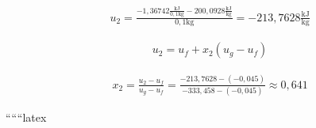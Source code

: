 \begin{align*}
    &u_2 = \frac{-1,36742 \frac{\text{kJ}}{0,1 \text{kg}} - 200,0928 \frac{\text{kJ}}{\text{kg}}}{0,1 \text{kg}} = -213,7628 \frac{\text{kJ}}{\text{kg}}
\end{align*}

\begin{align*}
    &u_2 = u_f + x_2 (u_g - u_f)
\end{align*}

\begin{align*}
    &x_2 = \frac{u_2 - u_f}{u_g - u_f} = \frac{-213,7628 - (-0,045)}{-333,458 - (-0,045)} \approx 0,641
\end{align*}

``````latex


